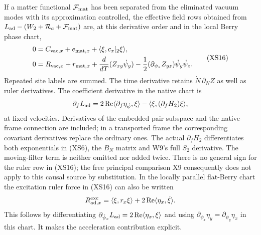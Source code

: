 \documentclass[11pt]{article}
\begin{document}
If a matter functional ${\cal F}_{\rm mat}$ has been separated
from the eliminated vacuum modes with its approximation
controlled, the effective field rows obtained from
$L_{\rm ad}-(W_2+{\cal R}_a+{\cal F}_{\rm mat})$ are,
at this derivative order and in the local Berry phase chart,
\begin{equation}
 \begin{aligned}
 0&=C_{{\rm vac},x}+e_{{\rm mat},x}
                         +\langle\xi,c_x|_2\xi\rangle,\\
 0&=R_{{\rm vac},x}+r_{{\rm mat},x}
       +\frac{d}{dT}(Z_{xy}\dot\psi_y)
       -\frac12(\partial_{\psi_x}Z_{yz})\dot\psi_y\dot\psi_z .
 \end{aligned}\tag{XS16}
\end{equation}
Repeated site labels are summed.  The time derivative
retains $\dot N\,\partial_N Z$ as well as ruler derivatives.
The coefficient derivative in the native chart is
\[
 \partial_f L_{\rm ad}
  =2\operatorname{Re}
       \langle\partial_f\eta_{\dot\psi},\xi\rangle
       -\langle\xi,(\partial_fH_2)\xi\rangle ,
\]
at fixed velocities.  Derivatives of the embedded pair
subspace and the native-frame connection are included;
in a transported frame the corresponding covariant
derivatives replace the ordinary ones.
The actual $\partial_fH_2$ differentiates both exponentials
in (XS6), the $B_N$ matrix and W9's full $S_2$ derivative.
The moving-filter term is neither omitted nor added twice.
There is no general sign for the ruler row in (XS16);
the free principal comparison X9 consequently does not
apply to this causal source by substitution.
In the locally parallel flat-Berry chart the excitation
ruler force in (XS16) can also be written
\[
 R_{{\rm ad},x}^{\rm exc}
   =\langle\xi,r_x\xi\rangle
                   +2\operatorname{Re}\langle\eta_x,\dot\xi\rangle .
\]
This follows by differentiating
$\partial_{\dot\psi_x}L_{\rm ad}
=2\operatorname{Re}\langle\eta_x,\xi\rangle$ and using
$\partial_{\psi_x}\eta_y=\partial_{\psi_y}\eta_x$ in this
chart.  It makes the acceleration contribution explicit.
\end{document}
